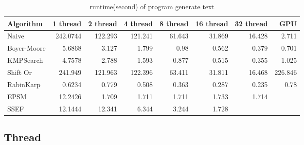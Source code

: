 \documentclass[11pt]{article}       %
\begin{document}
\begin{table}[htbp]
  \centering
  \caption{runtime(second) of program generate text}
    \begin{tabular}{lrrrrrrr}\label{t6}
Algorithm & 1 thread & 2 thread & 4 thread & 8 thread & 16 thread & 32 thread & GPU \\
 \hline
    Naive & 242.0744 & 122.293 & 121.241 & 61.643 & 31.869 & 16.428 & 2.711 \\
    Boyer-Moore & 5.6868 & 3.127 & 1.799 & 0.98  & 0.562 & 0.379 & 0.701 \\
    KMPSearch & 4.7578 & 2.788 & 1.593 & 0.877 & 0.515 & 0.355 & 1.025 \\
    Shift Or & 241.949 & 121.963 & 122.396 & 63.411 & 31.811 & 16.468 & 226.846 \\
    RabinKarp & 0.6234 & 0.779 & 0.508 & 0.363 & 0.287 & 0.235 & 0.78 \\
    EPSM  & 12.2426 & 1.709 & 1.711 & 1.711 & 1.733 & 1.714 &  \\
    SSEF  & 12.1444 & 12.341 & 6.344 & 3.244 & 1.728 &       &  \\
    \end{tabular}%
  \label{tab:addlabel}%
\end{table}%

\subsection{Thread}\label{tf}
\end{document}
